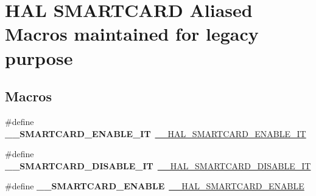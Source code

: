 \hypertarget{group___h_a_l___s_m_a_r_t_c_a_r_d___aliased___macros}{}\section{H\+AL S\+M\+A\+R\+T\+C\+A\+RD Aliased Macros maintained for legacy purpose}
\label{group___h_a_l___s_m_a_r_t_c_a_r_d___aliased___macros}
\subsection*{Macros}
\begin{DoxyCompactItemize}
\item 
\mbox{\label{group___h_a_l___s_m_a_r_t_c_a_r_d___aliased___macros_ga8d5d23bc871cf5aef481120b55f7ac9f}} 
\#define {\bfseries \+\_\+\+\_\+\+S\+M\+A\+R\+T\+C\+A\+R\+D\+\_\+\+E\+N\+A\+B\+L\+E\+\_\+\+IT}~\hyperlink{group___s_m_a_r_t_c_a_r_d___exported___macros_gaa80e83666a04249e0c7ca26d036a0d3b}{\+\_\+\+\_\+\+H\+A\+L\+\_\+\+S\+M\+A\+R\+T\+C\+A\+R\+D\+\_\+\+E\+N\+A\+B\+L\+E\+\_\+\+IT}
\item 
\mbox{\label{group___h_a_l___s_m_a_r_t_c_a_r_d___aliased___macros_ga86c309a6a3c0780c7847062466aaf4cc}} 
\#define {\bfseries \+\_\+\+\_\+\+S\+M\+A\+R\+T\+C\+A\+R\+D\+\_\+\+D\+I\+S\+A\+B\+L\+E\+\_\+\+IT}~\hyperlink{group___s_m_a_r_t_c_a_r_d___exported___macros_gaa85d69ff6a1a3bd9d00bdfb35122375d}{\+\_\+\+\_\+\+H\+A\+L\+\_\+\+S\+M\+A\+R\+T\+C\+A\+R\+D\+\_\+\+D\+I\+S\+A\+B\+L\+E\+\_\+\+IT}
\item 
\mbox{\label{group___h_a_l___s_m_a_r_t_c_a_r_d___aliased___macros_gaa4e29e98414736502d7ee2371481d9f6}} 
\#define {\bfseries \+\_\+\+\_\+\+S\+M\+A\+R\+T\+C\+A\+R\+D\+\_\+\+E\+N\+A\+B\+LE}~\hyperlink{group___s_m_a_r_t_c_a_r_d___exported___macros_gac739764f1f7326689516931771d60742}{\+\_\+\+\_\+\+H\+A\+L\+\_\+\+S\+M\+A\+R\+T\+C\+A\+R\+D\+\_\+\+E\+N\+A\+B\+LE}
\item 
\mbox{\label{group___h_a_l___s_m_a_r_t_c_a_r_d___aliased___macros_ga7765cb32d89b868ca5e775e7b6a571c7}} 

\end{DoxyCompactItemize}
